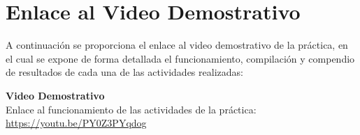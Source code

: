
\section{Enlace al Video Demostrativo}

A continuación se proporciona el enlace al video demostrativo de la práctica, en el cual se expone de forma detallada el funcionamiento, compilación y compendio de resultados de cada una de las actividades realizadas:

\vspace{1.5cm}
\begin{center}
    \Large\textbf{Video Demostrativo} \\[0.5cm]
    \normalsize
    Enlace al funcionamiento de las actividades de la práctica: \\[0.3cm]
    \url{https://youtu.be/PY0Z3PYqdog}
\end{center}
